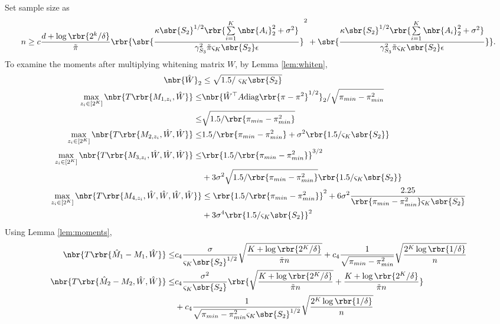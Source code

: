 \documentclass[twoside,11pt]{article}
\begin{document}
{Set sample size as 
  \begin{align*}
    n \geq c \frac{d+\log\rbr{2^k/\delta}}{\tilde{\pi}} \rbr{ \sbr{ \frac{\kappa \sbr{S_2}^{1/2}  \rbr{  \sum \limits_{i=1}^K \nbr{A_i}_2^2 + \sigma^2}}{\gamma_{S_3}^2 \tilde{\pi} \varsigma_K\sbr{S_2} \epsilon} }^2 + \sbr{ \frac{\kappa \sbr{S_2}^{1/2}  \rbr{  \sum \limits_{i=1}^K \nbr{A_i}_2^2 + \sigma^2}}{\gamma_{S_3}^2 \tilde{\pi} \varsigma_K\sbr{S_2} \epsilon} }}.
  \end{align*}
To examine the moments after multiplying whitening matrix $W$, by Lemma \ref{lem:whiten},
  \begin{align}
    \nbr{\hat{W}}_2 &\leq \sqrt{1.5 /\ \varsigma_K \sbr{S_2}} \\
    \max_{z_i \in [2^K]} \nbr{T\rbr{M_{1,z_i}, \hat{W}}} \leq& \nbr{\hat{W}^\top A\mathrm{diag}\rbr{\pi-\pi^2}^{1/2}}_2/\sqrt{\pi_{min}-\pi_{min}^2}\\
                                                       \leq& \sqrt{1.5/\rbr{\pi_{min}-\pi_{min}^2}} \\
    \max_{z_i \in [2^K]} \nbr{T\rbr{M_{2,z_i}, \hat{W},\hat{W}}} \leq&  1.5/\rbr{\pi_{min}-\pi_{min}^2} + \sigma^2 \rbr{1.5/\varsigma_K\sbr{S_2}}  \\
    \max_{z_i \in [2^K]} \nbr{T\rbr{M_{3,z_i}, \hat{W},\hat{W},\hat{W}}} \leq& \rbr{1.5/\rbr{\pi_{min}-\pi_{min}^2}}^{3/2}\nonumber\\
    & + 3 \sigma^2 \sqrt{1.5/\rbr{\pi_{min}-\pi_{min}^2}} \rbr{1.5/\varsigma_K\sbr{S_2}}  \\
    \max_{z_i \in [2^K]} \nbr{T\rbr{M_{4,z_i}, \hat{W},\hat{W},\hat{W},\hat{W}}} &\leq \rbr{1.5/\rbr{\pi_{min}-\pi_{min}^2}}^2 + 6 \sigma^2 \frac{2.25}{\rbr{\pi_{min}-\pi_{min}^2}\varsigma_K\sbr{S_2} } \nonumber\\
    &+ 3\sigma^4 \rbr{ 1.5/\varsigma_K\sbr{S_2}}^2
  \end{align}
Using Lemma \ref{lem:moments}, 
\begin{align}
  \nbr{T\rbr{\hat{M}_1-M_1,\hat{W}}} \leq& c_4 \frac{\sigma}{\varsigma_K\sbr{S_2}^{1/2}} \sqrt{\frac{K+\log \rbr{2^K/\delta}}{\tilde{\pi}n}} + c_4 \frac{1}{\sqrt{\pi_{min}-\pi_{min}^2}}  \sqrt{\frac{2^K\log \rbr{1/\delta}}{n}}\\
 \nbr{T\rbr{\hat{M}_2-M_2,\hat{W},\hat{W}}} \leq& c_4 \frac{\sigma^2}{\varsigma_K\sbr{S_2}}\rbr{ \sqrt{\frac{K+\log \rbr{2^K/\delta}}{\tilde{\pi}n}}+\frac{K+\log \rbr{2^K/\delta}}{\tilde{\pi}n} }\nonumber\\
  &+ c_4 \frac{1}{\sqrt{\pi_{min}-\pi_{min}^2} \varsigma_K\sbr{S_2}^{1/2}}  \sqrt{\frac{2^K\log \rbr{1/\delta}}{n}}\nonumber \\

\end{align}}
\end{document}
